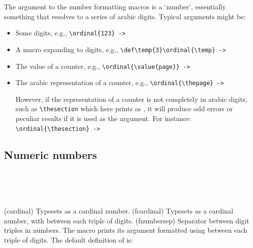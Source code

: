     The argument to the number formatting macros is a `number', 
essentially something that resolves to a series of arabic digits. Typical
arguments might be:
\begin{itemize}
\item Some digits, e.g., \verb?\ordinal{123} ->? 
\item A macro expanding to digits, e.g., \verb?\def\temp{3}\ordinal{\temp} ->? 
      \begingroup\def\temp{3}\ordinal{\temp}\endgroup %

\item The value of a counter, e.g., \verb?\ordinal{\value{page}} ->? 
      \ordinal{\value{page}} 
\item The arabic representation of a counter, e.g., \verb?\ordinal{\thepage} ->? 
      \ordinal{\thepage} 

However, if the representation of a counter is not completely in arabic 
digits, such as \verb?\thesection? which here prints as \thesection, it will 
produce odd errors or peculiar results if it is used as the argument.
For instance: \\
\verb?\ordinal{\thesection} ->? \ordinal{\thesection}

\end{itemize}

\subsection{Numeric numbers}

\begin{syntax}
\cmd{\cardinal} \\
\cmd{\fcardinal} \\
\cmd{\fnumbersep} \\
\end{syntax}
\glossary(cardinal)%
  {}%
  {Typesets  as a cardinal number.}
\glossary(fcardinal)%
  {}%
  {Typesets  as a cardinal number, with  between
   each triple of digits.}
\glossary(fnumbersep)%
  {}%
  {Separator between digit triples in numbers.}
The macro \cmd{\fcardinal} prints its  argument formatted using
\cmd{\fnumbersep} between each triple of digits. The default definition
of \cmd{\fnumbersep} is:
\begin{lcode}
\newcommand{\fnumbersep}{,}
\end{lcode}


